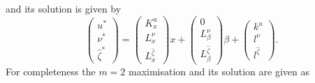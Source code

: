 \documentclass{ifacconf}
\begin{document}
and its solution is given by
\[
	\left(\begin{array}{c}
	u^\ast \\
	\nu^\ast \\
	\hat\zeta^\ast
	\end{array}\right) = \left(\begin{array}{c}K^u_x\\ L^{\nu}_x \\ L^{\hat\zeta}_x
	\end{array}\right)x + 
	\left(\begin{array}{c}0\\ L^{\nu}_\beta \\ L^{\hat\zeta}_{\beta}
	\end{array}\right)\beta + \left(\begin{array}{c}k^u\\ l^{\nu} \\ l^{\hat\zeta}
	\end{array}\right).
\]
For completeness the $m=2$ maximisation and its solution are given as
\end{document}
